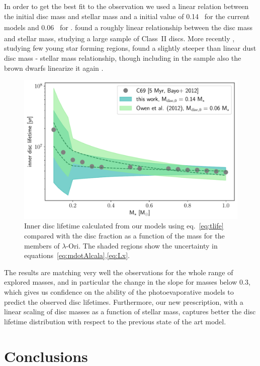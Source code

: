 \documentclass[usenatbib,useAMS,usedcolumn]{mnras}
\begin{document}
In order to get the best fit to the observation we used a linear relation between the initial disc mass and stellar mass and a initial value of \SI{0.14}{_\star} for the current models and \SI{0.06}{_\star} for .
 found a roughly linear relationship between the disc mass and stellar mass, studying a large sample of Class~II discs. More recently , studying few young star forming regions, found a slightly steeper than linear dust disc mass - stellar mass relationship, though including in the sample also the brown dwarfs linearize it again .
\begin{figure}
    \centering
    \includegraphics[width=\columnwidth]{Figure11}
    \caption{Inner disc lifetime calculated from our models using eq.~\ref{eq:tlife} compared with the disc fraction as a function of the mass for the members of $\lambda$-Ori. The shaded regions show the uncertainty in equations~\ref{eq:mdotAlcala},\ref{eq:Lx}. \label{fig:obs}}
\end{figure}
The results are matching very well the observations for the whole range of explored masses, and in particular the change in the slope for masses below \SI{0.3}{\solarmass}, which gives us confidence on the ability of the photoevaporative models to predict the observed disc lifetimes. Furthermore, our new prescription, with a linear scaling of disc masses as a function of stellar mass, captures better the disc lifetime distribution with respect to the previous state of the art model.

\section{Conclusions}\label{sec:conclusions}
\end{document}
